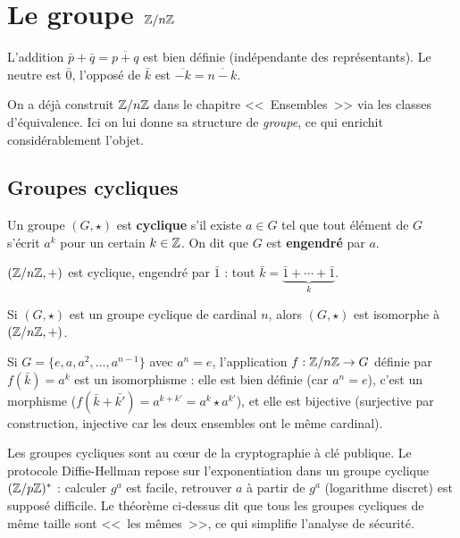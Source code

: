 \section{Le groupe $\mathbb{Z}/n\mathbb{Z}$}

\begin{propbox}
L'addition $\bar{p} + \bar{q} = \overline{p + q}$ est bien définie (indépendante des représentants). Le neutre est $\bar{0}$, l'opposé de $\bar{k}$ est $\overline{-k} = \overline{n - k}$.
\end{propbox}

\begin{intuitionbox}
On a déjà construit $\mathbb{Z}/n\mathbb{Z}$ dans le chapitre <<~Ensembles~>> via les classes d'équivalence. Ici on lui donne sa structure de \emph{groupe}, ce qui enrichit considérablement l'objet.
\end{intuitionbox}

\subsection{Groupes cycliques}

\begin{defbox}
Un groupe $(G, \star)$ est \textbf{cyclique} s'il existe $a \in G$ tel que tout élément de $G$ s'écrit $a^k$ pour un certain $k \in \mathbb{Z}$. On dit que $G$ est \textbf{engendré} par $a$.
\end{defbox}

$(\mathbb{Z}/n\mathbb{Z}, +)$ est cyclique, engendré par $\bar{1}$ : tout $\bar{k} = \underbrace{\bar{1} + \cdots + \bar{1}}_{k}$.

\begin{thmbox}
Si $(G, \star)$ est un groupe cyclique de cardinal $n$, alors $(G, \star)$ est isomorphe à $(\mathbb{Z}/n\mathbb{Z}, +)$.
\end{thmbox}

\begin{proofbox}[Idée]
Si $G = \{e, a, a^2, \ldots, a^{n-1}\}$ avec $a^n = e$, l'application $f : \mathbb{Z}/n\mathbb{Z} \to G$ définie par $f(\bar{k}) = a^k$ est un isomorphisme : elle est bien définie (car $a^n = e$), c'est un morphisme ($f(\bar{k} + \bar{k'}) = a^{k+k'} = a^k \star a^{k'}$), et elle est bijective (surjective par construction, injective car les deux ensembles ont le même cardinal).
\end{proofbox}

\begin{intuitionbox}
Les groupes cycliques sont au c\oe ur de la cryptographie à clé publique. Le protocole Diffie-Hellman repose sur l'exponentiation dans un groupe cyclique $(\mathbb{Z}/p\mathbb{Z})^*$ : calculer $g^a$ est facile, retrouver $a$ à partir de $g^a$ (logarithme discret) est supposé difficile. Le théorème ci-dessus dit que tous les groupes cycliques de même taille sont <<~les mêmes~>>, ce qui simplifie l'analyse de sécurité.
\end{intuitionbox}


